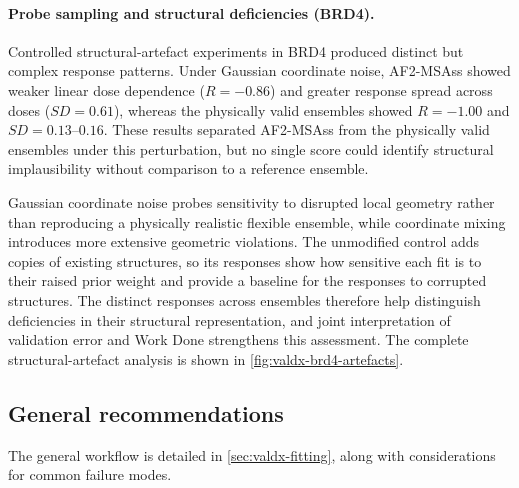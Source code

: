 \paragraph{Probe sampling and structural deficiencies (BRD4).}
Controlled structural-artefact experiments in BRD4 produced distinct but complex response patterns. Under Gaussian coordinate noise, AF2-MSAss showed weaker linear dose dependence ($R=-0.86$) and greater response spread across doses ($SD=0.61$), whereas the physically valid ensembles showed $R=-1.00$ and $SD=0.13$--$0.16$. These results separated AF2-MSAss from the physically valid ensembles under this perturbation, but no single score could identify structural implausibility without comparison to a reference ensemble.

Gaussian coordinate noise probes sensitivity to disrupted local geometry rather than reproducing a physically realistic flexible ensemble, while coordinate mixing introduces more extensive geometric violations. The unmodified control adds copies of existing structures, so its responses show how sensitive each fit is to their raised prior weight and provide a baseline for the responses to corrupted structures. The distinct responses across ensembles therefore help distinguish deficiencies in their structural representation, and joint interpretation of validation error and Work Done strengthens this assessment. The complete structural-artefact analysis is shown in \cref{fig:valdx-brd4-artefacts}.

\subsection{General recommendations}
\label{sec:valdx-recommendations}

The general workflow is detailed in \cref{sec:valdx-fitting}, along with considerations for common failure modes.

